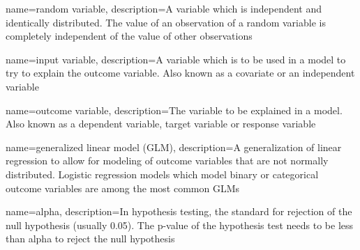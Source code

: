 {
    name={random variable},
    description={A variable which is independent and identically distributed.  The value of an observation of a random variable is completely independent of the value of other observations}
}

{
    name={input variable},
    description={A variable which is to be used in a model to try to explain the outcome variable.  Also known as a covariate or an independent variable}
}

{
    name={outcome variable},
    description={The variable to be explained in a model.  Also known as a dependent variable, target variable or response variable}
}

{
    name={generalized linear model (GLM)},
    description={A generalization of linear regression to allow for modeling of outcome variables that are not normally distributed.  Logistic regression models which model binary or categorical outcome variables are among the most common GLMs}
}

{
    name={alpha},
    description={In hypothesis testing, the standard for rejection of the null hypothesis (usually 0.05).  The p-value of the hypothesis test needs to be less than alpha to reject the null hypothesis}
}

\glsaddall

\frontmatter
